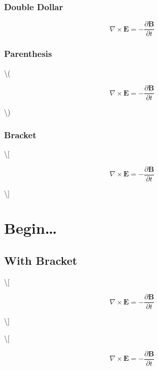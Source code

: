\documentclass[]{article}
\begin{document}
\subsubsection{Double Dollar}\label{double-dollar}

\[\begin{equation}\nabla \times \mathbf{E} = - \frac{\partial \mathbf{B}}{\partial t}\end{equation}\]

\subsubsection{Parenthesis}\label{parenthesis-1}

\textbackslash{}(

\begin{equation}\nabla \times \mathbf{E} = - \frac{\partial \mathbf{B}}{\partial t}\end{equation}

\textbackslash{})

\subsubsection{Bracket}\label{bracket-1}

\textbackslash{}{[}

\begin{equation}\nabla \times \mathbf{E} = - \frac{\partial \mathbf{B}}{\partial t}\end{equation}

\textbackslash{}{]}

\section{Begin\ldots{}}\label{begin}

\subsection{With Bracket}\label{with-bracket}

\textbackslash{}{[}

\begin{equation}
\nabla \times \mathbf{E} = - \frac{\partial \mathbf{B}}{\partial t}
\end{equation}

\textbackslash{}{]}

\textbackslash{}{[}

\begin{equation*}
\nabla \times \mathbf{E} = - \frac{\partial \mathbf{B}}{\partial t}
\end{equation*}
\end{document}
